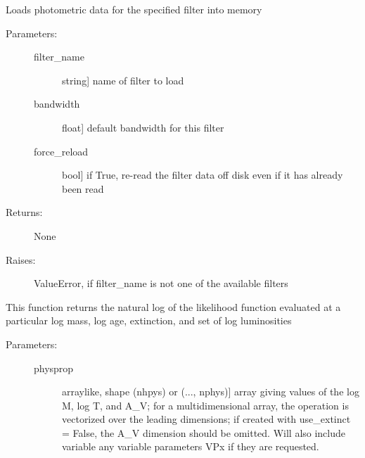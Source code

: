 \documentclass[letterpaper,10pt,english]{sphinxmanual}
\begin{document}
\begin{fulllineitems}
\begin{fulllineitems}
\label{cluster_slug:slugpy.cluster_slug.cluster_slug.load_data}
Loads photometric data for the specified filter into memory
\begin{description}
\item[{Parameters:}] \leavevmode\begin{description}
\item[{filter\_name}] \leavevmode{[}string{]}
name of filter to load

\item[{bandwidth}] \leavevmode{[}float{]}
default bandwidth for this filter

\item[{force\_reload}] \leavevmode{[}bool{]}
if True, re-read the filter data off disk even if it has
already been read

\end{description}

\item[{Returns:}] \leavevmode
None

\item[{Raises:}] \leavevmode
ValueError, if filter\_name is not one of the available
filters

\end{description}

\end{fulllineitems}


\begin{fulllineitems}
\label{cluster_slug:slugpy.cluster_slug.cluster_slug.logL}
This function returns the natural log of the likelihood
function evaluated at a particular log mass, log age,
extinction, and set of log luminosities
\begin{description}
\item[{Parameters:}] \leavevmode\begin{description}
\item[{physprop}] \leavevmode{[}arraylike, shape (nhpys) or (..., nphys){]}
array giving values of the log M, log T, and A\_V; for a
multidimensional array, the operation is vectorized over
the leading dimensions; if created with use\_extinct =
False, the A\_V dimension should be omitted.
Will also include variable any variable parameters VPx if
they are requested.


\end{description}
\end{description}
\end{fulllineitems}
\end{fulllineitems}
\end{document}
